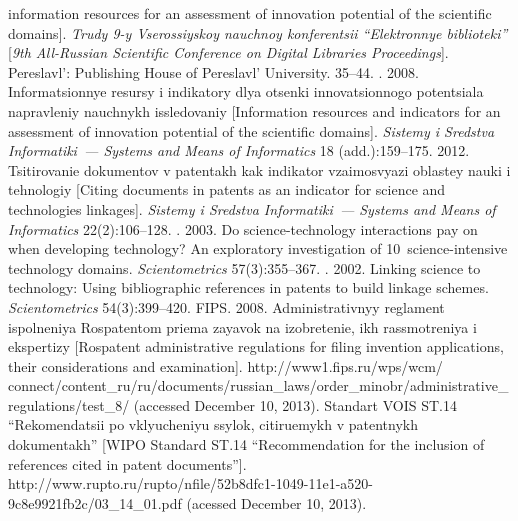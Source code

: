\begin{multicols}{2}
{{\begin{thebibliography}{99}
information resources for an assessment of innovation potential of the scientific domains]. 
\textit{Trudy 9-y Vserossiyskoy nauchnoy konferentsii ``Elektronnye biblioteki''} [\textit{9th 
      All-Russian Scientific Conference on Digital Libraries Proceedings}]. Pereslavl': Publishing 
House of Pereslavl' University. 35--44.
      . 2008. Informatsionnye resursy i indikatory 
dlya otsenki innova\-tsi\-on\-no\-go potentsiala napravleniy nauchnykh issledovaniy [Information resources and 
indicators for an assessment of innovation potential of the scientific domains]. 
\textit{Sistemy i
Sredstva Informatiki~--- Systems and 
Means of Informatics} 18 (add.):159--175.
       2012. Tsitirovanie dokumentov v patentakh kak indikator vzaimosvyazi 
oblastey nauki i tehnologiy [Citing documents in patents as an indicator for 
science and technologies linkages]. \textit{Sistemy i
Sredstva Informatiki~---
Systems and Means of Informatics} 
22(2):106--128.
      . 2003. Do science-technology interactions pay on when developing technology? An 
exploratory investigation of 10~science-intensive technology domains. \textit{Scientometrics} 
57(3):355--367.
      . 
2002. Linking science to technology: Using bibliographic references in patents to build linkage 
schemes. \textit{Scientometrics} 54(3):399--420.
FIPS. 2008.       Administrativnyy reglament ispolneniya Rospatentom priema zayavok na izobretenie, ikh 
ras\-smot\-re\-niya i ekspertizy [Rospatent administrative regulations for filing invention applications, their 
considerations and examination].  {\sf 
http://www1.fips.ru/wps/wcm/\linebreak 
connect/content\_ru/ru/documents/russian\_laws/order\_\linebreak minobr/administrative\_regulations/test\_8/}
(accessed December 10, 2013).
      Standart VOIS ST.14 ``Rekomendatsii po vklyu\-che\-niyu ssylok, citiruemykh v patentnykh 
dokumentakh'' [WIPO Standard ST.14 ``Recommendation for the inclusion of references cited in patent 
documents''].  {\sf http://www.rupto.ru/rupto/nfile/52b8dfc1-1049-11e1-a520-9c8e9921fb2c/03\_14\_01.pdf}
(acessed December 10, 2013).



\end{thebibliography}}}
\end{multicols}

